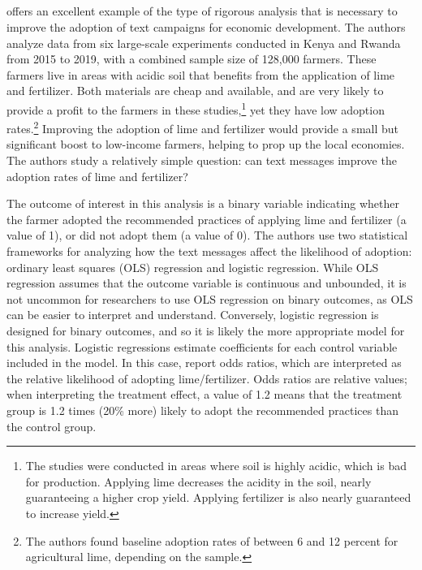 \documentclass[12pt]{article}
\begin{document}
\subsection{\textcite{fabregas_digital_2025}}
\textcite{fabregas_digital_2025} offers an excellent example of the type of rigorous analysis that is necessary to improve the adoption of text campaigns for economic development. The authors analyze data from six large-scale experiments conducted in Kenya and Rwanda from 2015 to 2019, with a combined sample size of 128,000 farmers. These farmers live in areas with acidic soil that benefits from the application of lime and fertilizer. Both materials are cheap and available, and are very likely to provide a profit to the farmers in these studies,\footnote{The studies were conducted in areas where soil is highly acidic, which is bad for production. Applying lime decreases the acidity in the soil, nearly guaranteeing a higher crop yield. Applying fertilizer is also nearly guaranteed to increase yield.} yet they have low adoption rates.\footnote{The authors found baseline adoption rates of between 6 and 12 percent for agricultural lime, depending on the sample.} Improving the adoption of lime and fertilizer would provide a small but significant boost to low-income farmers, helping to prop up the local economies. The authors study a relatively simple question: can text messages improve the adoption rates of lime and fertilizer?

The outcome of interest in this analysis is a binary variable indicating whether the farmer adopted the recommended practices of applying lime and fertilizer (a value of 1), or did not adopt them (a value of 0). The authors use two statistical frameworks for analyzing how the text messages affect the likelihood of adoption: ordinary least squares (OLS) regression and logistic regression. While OLS regression assumes that the outcome variable is continuous and unbounded, it is not uncommon for researchers to use OLS regression on binary outcomes, as OLS can be easier to interpret and understand. Conversely, logistic regression is designed for binary outcomes, and so it is likely the more appropriate model for this analysis. Logistic regressions estimate coefficients for each control variable included in the model. In this case, \textcite{fabregas_digital_2025} report odds ratios, which are interpreted as the relative likelihood of adopting lime/fertilizer. Odds ratios are relative values; when interpreting the treatment effect, a value of 1.2 means that the treatment group is 1.2 times (20\% more) likely to adopt the recommended practices than the control group.
\end{document}
